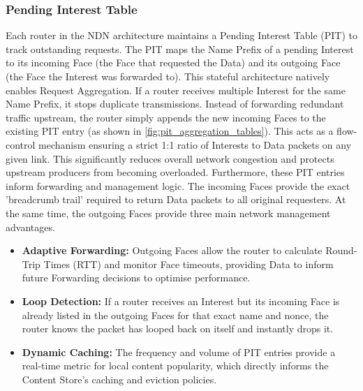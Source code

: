 \documentclass[12pt]{report}
\begin{document}
\subsubsection{Pending Interest Table}
Each router in the NDN architecture maintains a Pending Interest Table (PIT) to track outstanding requests. The PIT maps the Name Prefix of a pending Interest to its incoming Face (the Face that requested the Data) and its outgoing Face (the Face the Interest was forwarded to). This stateful architecture natively enables Request Aggregation. If a router receives multiple Interest for the same Name Prefix, it stops duplicate transmissions. Instead of forwarding redundant traffic upstream, the router simply appends the new incoming Faces to the existing PIT entry (as shown in \cref{fig:pit_aggregation_tables}). This acts as a flow-control mechanism ensuring a strict 1:1 ratio of Interests to Data packets on any given link. This significantly reduces overall network congestion and protects upstream producers from becoming overloaded.
Furthermore, these PIT entries inform forwarding and management logic. The incoming Faces provide the exact 'breadcrumb trail' required to return Data packets to all original requesters. At the same time, the outgoing Faces provide three main network management advantages.
\begin{itemize}
    \item \textbf{Adaptive Forwarding:} Outgoing Faces allow the router to calculate Round-Trip Times (RTT) and monitor Face timeouts, providing Data to inform future Forwarding decisions to optimise performance.
    \item \textbf{Loop Detection:} If a router receives an Interest but its incoming Face is already listed in the outgoing Faces for that exact name and nonce, the router knows the packet has looped back on itself and instantly drops it.
    \item \textbf{Dynamic Caching:} The frequency and volume of PIT entries provide a real-time metric for local content popularity, which directly informs the Content Store's caching and eviction policies.
\end{itemize}
\end{document}
